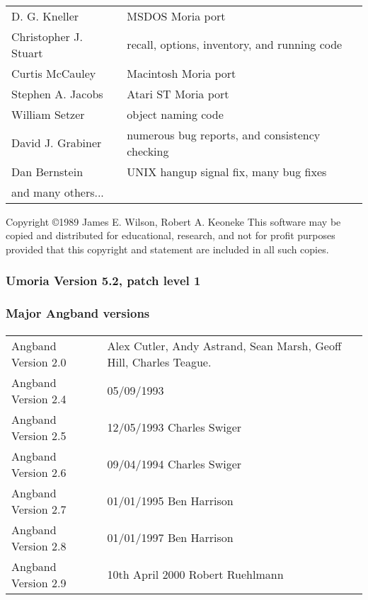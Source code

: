 \paragraph{}
\begin{tabular}{ll}
D. G. Kneller         & MSDOS Moria port \\
Christopher J. Stuart & recall, options, inventory, and running code \\
Curtis McCauley       & Macintosh Moria port \\ 
Stephen A. Jacobs     & Atari ST Moria port \\
William Setzer        & object naming code \\
David J. Grabiner     & numerous bug reports, and consistency checking \\
Dan Bernstein         & UNIX hangup signal fix, many bug fixes \\
and many others...&
\end{tabular}

Copyright \copyright 1989 James E. Wilson, Robert A. Keoneke
  This software may be copied and distributed for educational, research, and
  not for profit purposes provided that this copyright and statement are
  included in all such copies.

\subsubsection{Umoria Version 5.2, patch level 1}

\subsubsection{Major Angband versions}
\paragraph{}
\begin{tabular}{ll}
Angband Version 2.0   & Alex Cutler, Andy Astrand, Sean Marsh, Geoff Hill, 
                        Charles Teague.\\
Angband Version 2.4   & 05/09/1993\\
Angband Version 2.5   & 12/05/1993 Charles Swiger \index{Charles Swiger}\\
Angband Version 2.6   & 09/04/1994 Charles Swiger\\
Angband Version 2.7   & 01/01/1995 Ben Harrison \index{Ben Harrison}\\
Angband Version 2.8   & 01/01/1997 Ben Harrison\\
Angband Version 2.9   & 10th April 2000 Robert Ruehlmann \index{Robert
Ruehlmann}
\end{tabular}

